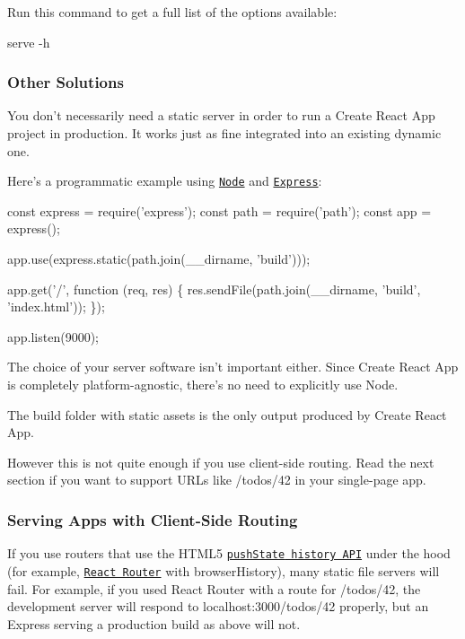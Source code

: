 Run this command to get a full list of the options available\+:


\begin{DoxyCode}
serve -h
\end{DoxyCode}


\subsubsection*{Other Solutions}

You don’t necessarily need a static server in order to run a Create React App project in production. It works just as fine integrated into an existing dynamic one.

Here’s a programmatic example using \href{https://nodejs.org/}{\tt Node} and \href{http://expressjs.com/}{\tt Express}\+:


\begin{DoxyCode}
const express = require('express');
const path = require('path');
const app = express();

app.use(express.static(path.join(\_\_dirname, 'build')));

app.get('/', function (req, res) \{
  res.sendFile(path.join(\_\_dirname, 'build', 'index.html'));
\});

app.listen(9000);
\end{DoxyCode}


The choice of your server software isn’t important either. Since Create React App is completely platform-\/agnostic, there’s no need to explicitly use Node.

The {\ttfamily build} folder with static assets is the only output produced by Create React App.

However this is not quite enough if you use client-\/side routing. Read the next section if you want to support U\+R\+Ls like {\ttfamily /todos/42} in your single-\/page app.

\subsubsection*{Serving Apps with Client-\/\+Side Routing}

If you use routers that use the H\+T\+M\+L5 \href{https://developer.mozilla.org/en-US/docs/Web/API/History_API#Adding_and_modifying_history_entries}{\tt {\ttfamily push\+State} history A\+PI} under the hood (for example, \href{https://github.com/ReactTraining/react-router}{\tt React Router} with {\ttfamily browser\+History}), many static file servers will fail. For example, if you used React Router with a route for {\ttfamily /todos/42}, the development server will respond to {\ttfamily localhost\+:3000/todos/42} properly, but an Express serving a production build as above will not.

